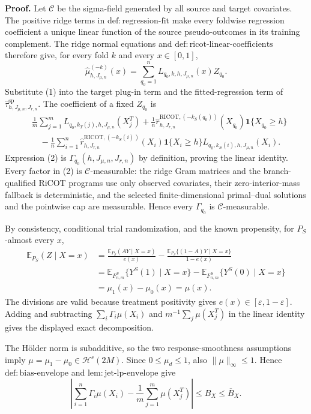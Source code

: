 \textbf{Proof.}
Let \(\mathcal C\) be the sigma-field generated by all source and target covariates. The positive ridge terms in \(\mathrm{def:regression\text{-}fit}\) make every foldwise regression coefficient a unique linear function of the source pseudo-outcomes in its training complement. The ridge normal equations and \(\mathrm{def:ricot\text{-}linear\text{-}coefficients}\) therefore give, for every fold \(k\) and every \(x\in[0,1]\),
\[
\widehat\mu^{(-k)}_{h,J_{\mu,n}}(x)
=\sum_{q_0=1}^n L_{q_0,k,h,J_{\mu,n}}(x)Z_{q_0}.
\tag{1}
\]
Substitute (1) into the target plug-in term and the fitted-regression term of \(\widehat\tau^{\mathrm{sp}}_{h,J_{\mu,n},J_{r,n}}\). The coefficient of a fixed \(Z_{q_0}\) is
\[
\begin{aligned}
{}&\frac1m\sum_{j=1}^mL_{q_0,k_T(j),h,J_{\mu,n}}(X_j^T)
+\frac1n\widehat r^{\mathrm{RICOT},(-k_S(q_0))}_{h,J_{r,n}}(X_{q_0})\mathbf 1\{X_{q_0}\ge h\}\\
&\quad-\frac1n\sum_{i=1}^n
\widehat r^{\mathrm{RICOT},(-k_S(i))}_{h,J_{r,n}}(X_i)\mathbf 1\{X_i\ge h\}
L_{q_0,k_S(i),h,J_{\mu,n}}(X_i).
\end{aligned}
\tag{2}
\]
Expression (2) is \(\Gamma_{q_0}(h,J_{\mu,n},J_{r,n})\) by definition, proving the linear identity. Every factor in (2) is \(\mathcal C\)-measurable: the ridge Gram matrices and the branch-qualified RiCOT programs use only observed covariates, their zero-interior-mass fallback is deterministic, and the selected finite-dimensional primal--dual solutions and the pointwise cap are measurable. Hence every \(\Gamma_{q_0}\) is \(\mathcal C\)-measurable.

By consistency, conditional trial randomization, and the known propensity, for \(P_S\)-almost every \(x\),
\[
\begin{aligned}
\mathbb E_{P_S}(Z\mid X=x)
&=\frac{\mathbb E_{P_S}(AY\mid X=x)}{e(x)}
-\frac{\mathbb E_{P_S}\{(1-A)Y\mid X=x\}}{1-e(x)}\\
&=\mathbb E_{F^S_{n,m}}\{Y^S(1)\mid X=x\}
-\mathbb E_{F^S_{n,m}}\{Y^S(0)\mid X=x\}\\
&=\mu_1(x)-\mu_0(x)=\mu(x).
\end{aligned}
\tag{3}
\]
The divisions are valid because treatment positivity gives \(e(x)\in[\varepsilon,1-\varepsilon]\). Adding and subtracting \(\sum_i\Gamma_i\mu(X_i)\) and \(m^{-1}\sum_j\mu(X_j^T)\) in the linear identity gives the displayed exact decomposition.

The H\"older norm is subadditive, so the two response-smoothness assumptions imply \(\mu=\mu_1-\mu_0\in\mathcal H^s(2M)\). Since \(0\le\mu_d\le1\), also \(\|\mu\|_\infty\le1\). Hence \(\mathrm{def:bias\text{-}envelope}\) and \(\mathrm{lem:jet\text{-}lp\text{-}envelope}\) give
\[
\left|\sum_{i=1}^n\Gamma_i\mu(X_i)-\frac1m\sum_{j=1}^m\mu(X_j^T)\right|
\le B_X\le\overline B_X.
\tag{4}
\]

